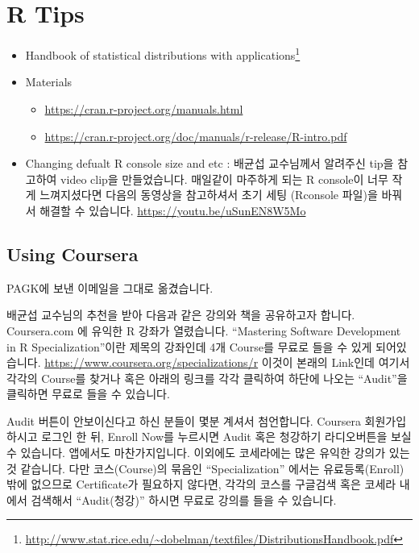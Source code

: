 \documentclass[11pt,]{krantz}
\providecommand{\tightlist}{%
  \setlength{\itemsep}{0pt}\setlength{\parskip}{0pt}}
\renewenvironment{quote}{\begin{VF}}{\end{VF}}
\renewcommand{\href}[2]{#2\footnote{\url{#1}}}
\theoremstyle{definition}
\theoremstyle{definition}
\theoremstyle{remark}
\begin{document}
\chapter{R Tips}\label{r-tips}

\begin{itemize}
\tightlist
\item
  \href{http://www.stat.rice.edu/~dobelman/textfiles/DistributionsHandbook.pdf}{Handbook
  of statistical distributions with applications}
  \citep{krishnamoorthy2006handbook}
\item
  Materials

  \begin{itemize}
  \tightlist
  \item
    \url{https://cran.r-project.org/manuals.html}
  \item
    \url{https://cran.r-project.org/doc/manuals/r-release/R-intro.pdf}
  \end{itemize}
\item
  Changing defualt R console size and etc : 배균섭 교수님께서 알려주신
  tip을 참고하여 video clip을 만들었습니다. 매일같이 마주하게 되는 R
  console이 너무 작게 느껴지셨다면 다음의 동영상을 참고하셔서 초기 세팅
  (Rconsole 파일)을 바꿔서 해결할 수 있습니다.
  \url{https://youtu.be/uSunEN8W5Mo}
\end{itemize}

\section{Using Coursera}\label{using-coursera}

\begin{quote}
PAGK에 보낸 이메일을 그대로 옮겼습니다.
\end{quote}

배균섭 교수님의 추천을 받아 다음과 같은 강의와 책을 공유하고자 합니다.
Coursera.com 에 유익한 R 강좌가 열렸습니다. ``Mastering Software
Development in R Specialization''이란 제목의 강좌인데 4개 Course를
무료로 들을 수 있게 되어있습니다.
\url{https://www.coursera.org/specializations/r} 이것이 본래의 Link인데
여기서 각각의 Course를 찾거나 혹은 아래의 링크를 각각 클릭하여 하단에
나오는 ``Audit''을 클릭하면 무료로 들을 수 있습니다.

Audit 버튼이 안보이신다고 하신 분들이 몇분 계셔서 첨언합니다. Coursera
회원가입하시고 로그인 한 뒤, Enroll Now를 누르시면 Audit 혹은 청강하기
라디오버튼을 보실 수 있습니다. 앱에서도 마찬가지입니다. 이외에도
코세라에는 많은 유익한 강의가 있는 것 같습니다. 다만 코스(Course)의
묶음인 ``Specialization'' 에서는 유료등록(Enroll) 밖에 없으므로
Certificate가 필요하지 않다면, 각각의 코스를 구글검색 혹은 코세라 내에서
검색해서 ``Audit(청강)'' 하시면 무료로 강의를 들을 수 있습니다.
\end{document}

